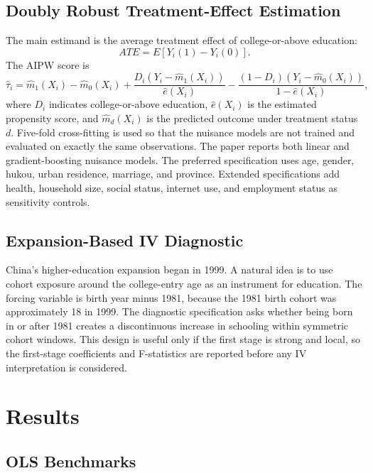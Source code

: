 \documentclass[12pt]{article}
\begin{document}
\subsection{Doubly Robust Treatment-Effect Estimation}

The main estimand is the average treatment effect of college-or-above education:
\begin{equation}
ATE=E[Y_i(1)-Y_i(0)].
\end{equation}
The AIPW score is
\begin{equation}
\hat{\tau}_i =
\hat{m}_1(X_i)-\hat{m}_0(X_i)
+\frac{D_i(Y_i-\hat{m}_1(X_i))}{\hat{e}(X_i)}
-\frac{(1-D_i)(Y_i-\hat{m}_0(X_i))}{1-\hat{e}(X_i)},
\end{equation}
where $D_i$ indicates college-or-above education, $\hat{e}(X_i)$ is the estimated propensity score, and $\hat{m}_d(X_i)$ is the predicted outcome under treatment status $d$. Five-fold cross-fitting is used so that the nuisance models are not trained and evaluated on exactly the same observations. The paper reports both linear and gradient-boosting nuisance models. The preferred specification uses age, gender, hukou, urban residence, marriage, and province. Extended specifications add health, household size, social status, internet use, and employment status as sensitivity controls.

\subsection{Expansion-Based IV Diagnostic}

China's higher-education expansion began in 1999. A natural idea is to use cohort exposure around the college-entry age as an instrument for education. The forcing variable is birth year minus 1981, because the 1981 birth cohort was approximately 18 in 1999. The diagnostic specification asks whether being born in or after 1981 creates a discontinuous increase in schooling within symmetric cohort windows. This design is useful only if the first stage is strong and local, so the first-stage coefficients and F-statistics are reported before any IV interpretation is considered.

\section{Results}

\subsection{OLS Benchmarks}
\end{document}
